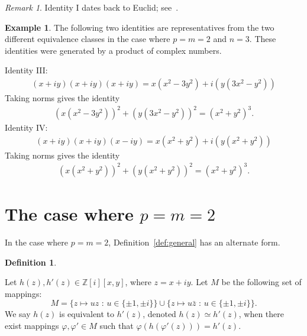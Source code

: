 \documentclass[12pt,table]{article}
\theoremstyle{definition}
\newtheorem{definition}[theorem]{Definition}
\newtheorem{example}[theorem]{Example}
\theoremstyle{remark}
\newtheorem{remark}[theorem]{Remark}
\newcommand{\Zzz}{\mathbb Z}
\numberwithin{equation}{section}
\begin{document}
\begin{remark}
Identity I dates back to Euclid; see~\cite{Euclid}. 
\end{remark}

\begin{example}
The following two identities are representatives from 
the two different equivalence classes in the
case where $ p = m = 2 $ and $ n = 3$.
These identities
were generated by a product of complex numbers. 

\noindent
Identity III:
\begin{align*}
    (x + iy)(x + iy)(x + iy) 
    = x(x^2 - 3y^2) + i(  y(3x^2 - y^2) )  
    \end{align*}
Taking norms gives the identity
    \begin{align}
    (x(x^2 - 3y^2))^2 + (  y(3x^2 - y^2) )^2  
    = (x^2 + y^2)^3.
    \end{align}
Identity IV:
    \begin{align*}
    (x + iy )(x + iy)(x - iy ) 
    = x(x^2 + y^2 ) + i(y(x^2 + y^2))  
    \end{align*}
Taking norms gives the identity
    \begin{align}
    ( x(x^2 + y^2) )^2 + ( y(x^2 + y^2) )^2 
    = (x^2 + y^2 )^3.
    \end{align}
\end{example}







\section{The case where $ p = m = 2$}


In the case where $ p = m = 2$, Definition~\ref{def:general} has an alternate form.



\begin{definition}
\label{def:2D}

Let $ h(z), h'(z) \in \Zzz [i][x,y] $,
where $ z = x + iy $.
Let $ M $ be the following set of mappings: 
\[
M = \{ z \mapsto uz \text{ : } u \in \{ \pm 1, \pm i \} \}  
\cup \{ z\mapsto u \bar{z} \text{ : } u \in \{ \pm 1, \pm i \} \}.  
\]
We say $ h(z) $ is equivalent to $ h'(z) $,
denoted $ h(z) \simeq h'(z) $,
when there exist mappings $ \varphi, \varphi' \in M $
such that $ \varphi( h( \varphi'( z ) ) )  = h'(z) $.



\end{definition}
\end{document}
